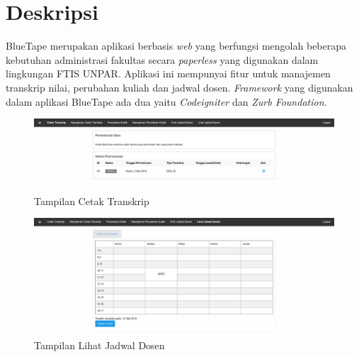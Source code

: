 \documentclass[a4paper,twoside]{article}
\begin{document}
\title{\@judultopik}
\author{\nama \textendash \@npm} 

\newcommand{\nama}{Hapsari Laksmi W}
\newcommand{\@npm}{2015730037}
\newcommand{\@judultopik}{Migrasi \textit{Zurb Foundation} ke \textit{Bootstrap 4}} %
\newcommand{\jumpemb}{1} %
\newcommand{\tanggal}{24/08/2019}


\maketitle


\section{Deskripsi}

BlueTape merupakan aplikasi berbasis \textit{web} yang berfungsi mengolah beberapa kebutuhan administrasi fakultas secara \textit{paperless} yang digunakan dalam lingkungan FTIS UNPAR.  Aplikasi ini mempunyai fitur untuk manajemen transkrip nilai, perubahan kuliah dan jadwal dosen. \textit{Framework} yang digunakan dalam aplikasi BlueTape ada dua yaitu \textit{Codeigniter} dan \textit{Zurb Foundation}.  

\begin{figure}[h]
\includegraphics [scale=0.5] {Tampilan-Cetak-Transkrip.PNG}
\caption{Tampilan Cetak Transkrip}
\end{figure}

\begin{figure}[h]
\includegraphics [scale=0.5] {Tampilan-Lihat-Jadwal-Dosen.PNG}
\caption{Tampilan Lihat Jadwal Dosen}
\end{figure}
\end{document}
